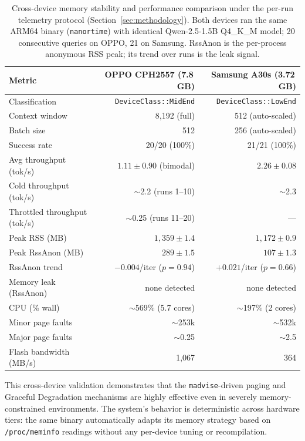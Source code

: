 \documentclass[11pt]{article}
\begin{document}
\begin{table}[h]
\centering
\caption{Cross-device memory stability and performance comparison under the
per-run telemetry protocol (Section~\ref{sec:methodology}). Both devices ran the
same ARM64 binary (\texttt{nanortime}) with identical Qwen-2.5-1.5B Q4\_K\_M
model; 20 consecutive queries on OPPO, 21 on Samsung. RssAnon is the
per-process anonymous RSS peak; its trend over runs is the leak signal.}
\label{tab:crossdevice}
\begin{tabular}{lrr}
\toprule
Metric & OPPO CPH2557 (7.8\,GB) & Samsung A30s (3.72\,GB) \\
\midrule
Classification & \texttt{DeviceClass::MidEnd} & \texttt{DeviceClass::LowEnd} \\
Context window & 8,192 (full) & 512 (auto-scaled) \\
Batch size & 512 & 256 (auto-scaled) \\
Success rate & 20/20 (100\%) & 21/21 (100\%) \\
Avg throughput (tok/s) & $1.11\pm0.90$ (bimodal) & $2.26\pm0.08$ \\
Cold throughput (tok/s) & $\sim$2.2 (runs 1--10) & $\sim$2.3 \\
Throttled throughput (tok/s) & $\sim$0.25 (runs 11--20) & --- \\
Peak RSS (MB) & $1{,}359\pm1.4$ & $1{,}172\pm0.9$ \\
Peak RssAnon (MB) & $289\pm1.5$ & $107\pm1.3$ \\
RssAnon trend & $-0.004$/iter ($p{=}0.94$) & $+0.021$/iter ($p{=}0.66$) \\
Memory leak (RssAnon) & none detected & none detected \\
CPU (\% wall) & $\sim$569\% (5.7 cores) & $\sim$197\% (2 cores) \\
Minor page faults & $\sim$253k & $\sim$532k \\
Major page faults & $\sim$0.25 & $\sim$2.5 \\
Flash bandwidth (MB/s) & 1,067 & 364 \\
\bottomrule
\end{tabular}
\end{table}

This cross-device validation demonstrates that the \texttt{madvise}-driven
paging and Graceful Degradation mechanisms are highly effective even in
severely memory-constrained environments. The system's behavior is
deterministic across hardware tiers: the same binary automatically adapts
its memory strategy based on \texttt{/proc/meminfo} readings without any
per-device tuning or recompilation.
\end{document}

